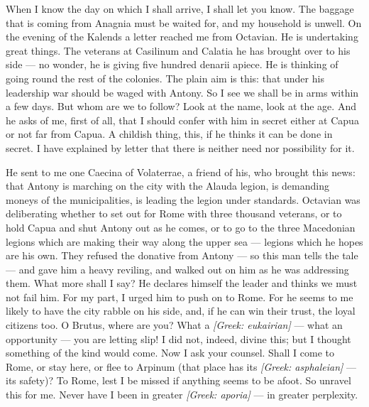 

 When I know the day on which I shall arrive, I shall let you know. The baggage that is coming from Anagnia must be waited for, and my household is unwell. On the evening of the Kalends a letter reached me from Octavian. He is undertaking great things. The veterans at Casilinum and Calatia he has brought over to his side --- no wonder, he is giving five hundred denarii apiece. He is thinking of going round the rest of the colonies. The plain aim is this: that under his leadership war should be waged with Antony. So I see we shall be in arms within a few days. But whom are we to follow? Look at the name, look at the age. And he asks of me, first of all, that I should confer with him in secret either at Capua or not far from Capua. A childish thing, this, if he thinks it can be done in secret. I have explained by letter that there is neither need nor possibility for it.

 He sent to me one Caecina of Volaterrae, a friend of his, who brought this news: that Antony is marching on the city with the Alauda legion, is demanding moneys of the municipalities, is leading the legion under standards. Octavian was deliberating whether to set out for Rome with three thousand veterans, or to hold Capua and shut Antony out as he comes, or to go to the three Macedonian legions which are making their way along the upper sea --- legions which he hopes are his own. They refused the donative from Antony --- so this man tells the tale --- and gave him a heavy reviling, and walked out on him as he was addressing them. What more shall I say? He declares himself the leader and thinks we must not fail him. For my part, I urged him to push on to Rome. For he seems to me likely to have the city rabble on his side, and, if he can win their trust, the loyal citizens too. O Brutus, where are you? What a \textit{[Greek: eukairian]} --- what an opportunity --- you are letting slip! I did not, indeed, divine this; but I thought something of the kind would come. Now I ask your counsel. Shall I come to Rome, or stay here, or flee to Arpinum (that place has its \textit{[Greek: asphaleian]} --- its safety)? To Rome, lest I be missed if anything seems to be afoot. So unravel this for me. Never have I been in greater \textit{[Greek: aporia]} --- in greater perplexity.
